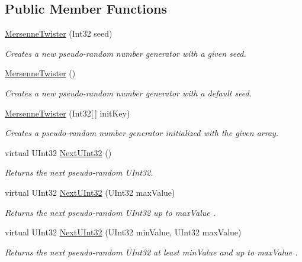 \subsection*{Public Member Functions}
\begin{DoxyCompactItemize}
\item 
\hyperlink{class_u_m_t_1_1_mersenne_twister_a67f0b71e30df455fbcbba80c1d6acff9}{Mersenne\+Twister} (Int32 seed)
\begin{DoxyCompactList}\small\item\em Creates a new pseudo-\/random number generator with a given seed. \end{DoxyCompactList}\item 
\hyperlink{class_u_m_t_1_1_mersenne_twister_a9c574150f1f8df915497e4fce82de379}{Mersenne\+Twister} ()
\begin{DoxyCompactList}\small\item\em Creates a new pseudo-\/random number generator with a default seed. \end{DoxyCompactList}\item 
\hyperlink{class_u_m_t_1_1_mersenne_twister_ad23eef1dca9522daa6853e90a8b66ae0}{Mersenne\+Twister} (Int32\mbox{[}$\,$\mbox{]} init\+Key)
\begin{DoxyCompactList}\small\item\em Creates a pseudo-\/random number generator initialized with the given array. \end{DoxyCompactList}\item 
virtual U\+Int32 \hyperlink{class_u_m_t_1_1_mersenne_twister_a64e210aa86b47d3949e0e1f676b91565}{Next\+U\+Int32} ()
\begin{DoxyCompactList}\small\item\em Returns the next pseudo-\/random U\+Int32. \end{DoxyCompactList}\item 
virtual U\+Int32 \hyperlink{class_u_m_t_1_1_mersenne_twister_a9766d3a6c32e994ff8e698f7e500365a}{Next\+U\+Int32} (U\+Int32 max\+Value)
\begin{DoxyCompactList}\small\item\em Returns the next pseudo-\/random U\+Int32 up to {\itshape max\+Value} . \end{DoxyCompactList}\item 
virtual U\+Int32 \hyperlink{class_u_m_t_1_1_mersenne_twister_a965c38b14f0936c9b2af279a5f385108}{Next\+U\+Int32} (U\+Int32 min\+Value, U\+Int32 max\+Value)
\begin{DoxyCompactList}\small\item\em Returns the next pseudo-\/random U\+Int32 at least {\itshape min\+Value}  and up to {\itshape max\+Value} . \end{DoxyCompactList}\item 

\end{DoxyCompactItemize}

